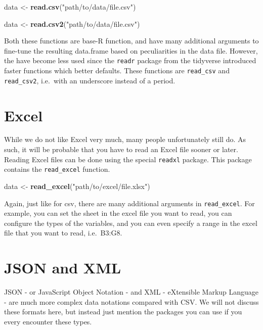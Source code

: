 \documentclass[]{tufte-book}
\newenvironment{Shaded}{}{}
\newcommand{\KeywordTok}[1]{\textcolor[rgb]{0.00,0.44,0.13}{\textbf{#1}}}
\newcommand{\StringTok}[1]{\textcolor[rgb]{0.25,0.44,0.63}{#1}}
\newcommand{\NormalTok}[1]{#1}
\begin{document}
\begin{Shaded}
\begin{Highlighting}[]
\NormalTok{data <-}\StringTok{ }\KeywordTok{read.csv}\NormalTok{(}\StringTok{"path/to/data/file.csv"}\NormalTok{)}

\NormalTok{data <-}\StringTok{ }\KeywordTok{read.csv2}\NormalTok{(}\StringTok{"path/to/data/file.csv"}\NormalTok{)}
\end{Highlighting}
\end{Shaded}

Both these functions are base-R function, and have many additional
arguments to fine-tune the resulting data.frame based on peculiarities
in the data file. However, the have become less used since the
\texttt{readr} package from the tidyverse introduced faster functions
which better defaults. These functions are \texttt{read\_csv} and
\texttt{read\_csv2}, i.e.~with an underscore instead of a period.

\section{Excel}\label{excel}

While we do not like Excel very much, many people unfortunately still
do. As such, it will be probable that you have to read an Excel file
sooner or later. Reading Excel files can be done using the special
\texttt{readxl} package. This package contains the \texttt{read\_excel}
function.

\begin{Shaded}
\begin{Highlighting}[]
\NormalTok{data <-}\StringTok{ }\KeywordTok{read_excel}\NormalTok{(}\StringTok{"path/to/excel/file.xlsx"}\NormalTok{)}
\end{Highlighting}
\end{Shaded}

Again, just like for csv, there are many additional arguments in
\texttt{read\_excel}. For example, you can set the sheet in the excel
file you want to read, you can configure the types of the variables, and
you can even specify a range in the excel file that you want to read,
i.e.~B3:G8.

\section{JSON and XML}\label{json-and-xml}

JSON - or JavaScript Object Notation - and XML - eXtensible Markup
Language - are much more complex data notations compared with CSV. We
will not discuss these formats here, but instead just mention the
packages you can use if you every encounter these types.
\end{document}
